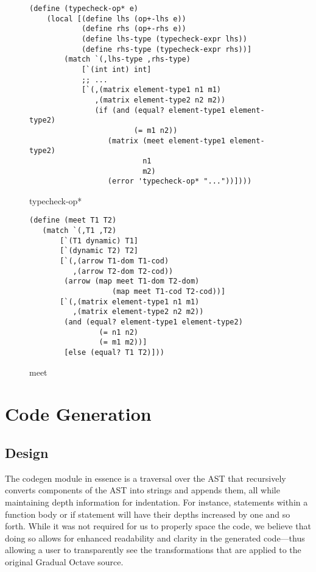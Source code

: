 \begin{figure}[h]
    \begin{lstlisting}[language=racket]
(define (typecheck-op* e)
    (local [(define lhs (op+-lhs e))
            (define rhs (op+-rhs e))
            (define lhs-type (typecheck-expr lhs))
            (define rhs-type (typecheck-expr rhs))]
        (match `(,lhs-type ,rhs-type)
            [`(int int) int]
            ;; ...
            [`(,(matrix element-type1 n1 m1)
               ,(matrix element-type2 n2 m2))
               (if (and (equal? element-type1 element-type2)
                        (= m1 n2))
                  (matrix (meet element-type1 element-type2)
                          n1
                          m2)
                  (error 'typecheck-op* "..."))])))
    \end{lstlisting}
    \caption[]{{typecheck-op*}}
    \label{fig:typecheck-op*}
\end{figure}

\begin{figure}[h]
    \begin{lstlisting}[language=racket]
(define (meet T1 T2)
   (match `(,T1 ,T2)
       [`(T1 dynamic) T1]
       [`(dynamic T2) T2]
       [`(,(arrow T1-dom T1-cod)
          ,(arrow T2-dom T2-cod))
        (arrow (map meet T1-dom T2-dom)
                   (map meet T1-cod T2-cod))]
       [`(,(matrix element-type1 n1 m1)
          ,(matrix element-type2 n2 m2))
        (and (equal? element-type1 element-type2)
                (= n1 n2)
                (= m1 m2))]
        [else (equal? T1 T2)]))
    \end{lstlisting}
    \caption[]{{meet}}
    \label{fig:meet}
\end{figure}

\section{Code Generation}

\subsection{Design}
The codegen module in essence is a traversal over the AST that recursively converts components of the AST into strings and appends them, all while maintaining depth information for indentation. For instance, statements within a function body or if statement will have their depths increased by one and so forth. While it was not required for us to properly space the code, we believe that doing so allows for enhanced readability and clarity in the generated code---thus allowing a user to transparently see the transformations that are applied to the original Gradual Octave source.


